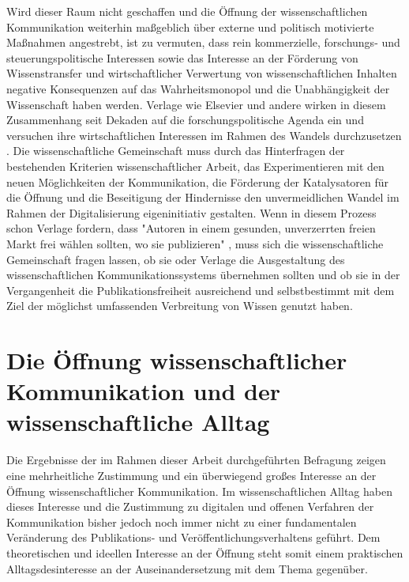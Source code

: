 Wird dieser Raum nicht geschaffen und die Öffnung der wissenschaftlichen Kommunikation weiterhin maßgeblich über externe und politisch motivierte Maßnahmen angestrebt, ist zu vermuten, dass rein kommerzielle, forschungs- und steuerungspolitische Interessen sowie das Interesse an der Förderung von Wissenstransfer und wirtschaftlicher Verwertung von wissenschaftlichen Inhalten negative Konsequenzen auf das Wahrheitsmonopol und die Unabhängigkeit der Wissenschaft haben werden. Verlage wie Elsevier und andere wirken in diesem Zusammenhang seit Dekaden auf die forschungspolitische Agenda ein und versuchen ihre wirtschaftlichen Interessen im Rahmen des Wandels durchzusetzen \cite[:15]{Hirschi_2015} \cite{Elsevier_2012}. Die wissenschaftliche Gemeinschaft muss durch das Hinterfragen der bestehenden Kriterien wissenschaftlicher Arbeit, das Experimentieren mit den neuen Möglichkeiten der Kommunikation, die Förderung der Katalysatoren für die Öffnung und die Beseitigung der Hindernisse den unvermeidlichen Wandel im Rahmen der Digitalisierung eigeninitiativ gestalten. Wenn in diesem Prozess schon Verlage fordern, dass "Autoren in einem gesunden, unverzerrten freien Markt frei wählen sollten, wo sie publizieren" \cite{Brussels_Declaration_2007}, muss sich die wissenschaftliche Gemeinschaft fragen lassen, ob sie oder Verlage die Ausgestaltung des wissenschaftlichen Kommunikationssystems übernehmen sollten und ob sie in der Vergangenheit die Publikationsfreiheit ausreichend und selbstbestimmt mit dem Ziel der möglichst umfassenden Verbreitung von Wissen genutzt haben.

\section{Die Öffnung wissenschaftlicher Kommunikation und der wissenschaftliche Alltag}

Die Ergebnisse der im Rahmen dieser Arbeit durchgeführten Befragung zeigen eine mehrheitliche Zustimmung und ein überwiegend großes Interesse an der Öffnung wissenschaftlicher Kommunikation. Im wissenschaftlichen Alltag haben dieses Interesse und die Zustimmung zu digitalen und offenen Verfahren der Kommunikation bisher jedoch noch immer nicht zu einer fundamentalen Veränderung des Publikations- und Veröffentlichungsverhaltens geführt. Dem theoretischen und ideellen Interesse an der Öffnung steht somit einem praktischen Alltagsdesinteresse an der Auseinandersetzung mit dem Thema gegenüber.

